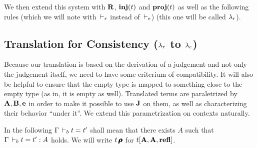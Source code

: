 \documentclass[a4paper,english]{lipics-utf8x}
\begin{document}
  We then extend this system with $\operatorname{\mathbf{R}}$, $\operatorname{\mathbf{inj}}(t)$ and $\operatorname{\mathbf{proj}}(t)$ as well as
  the following rules (which we will note with $\,\vdash_r$ instead of $\,\vdash_e$)
  (this one will be called $\lambda_r$).

  \begin{mathc}
    \ru{\derr \Gamma
      }{\Gamma \derr \mR : \sB}
    \qquad
    \qquad
  \end{mathc}

  \begin{mathc}
    \qquad
  \end{mathc}


  \subsection{Translation for Consistency ($\lambda_r$ to $\lambda_e$)}

  Because our translation is based on the derivation of a judgement and not
  only the judgement itself, we need to have some criterium of compatibility.
  It will also be helpful to ensure that the empty type is mapped to something
  close to the empty type (as in, it is empty as well).
  Translated terms are paraletrized by $\operatorname{\mathbf{A}},\operatorname{\mathbf{B}},\operatorname{\mathbf{e}}$ in order to make it
  possible to use $\operatorname{\mathbf{J}}$ on them, as well as characterizing their behavior
  ``under it''. We extend this parametrization on contexts naturally.

  In the following $\Gamma \,\vdash_b t = t'$ shall mean that there exists $A$
  such that $\Gamma \,\vdash_b t = t' : A$ holds. We will write $t\operatorname{\pmb{\bm{\rho}}}$ for
  $t[\operatorname{\mathbf{A}},\operatorname{\mathbf{A}},\operatorname{\mathbf{refl}}]$.
\end{document}
